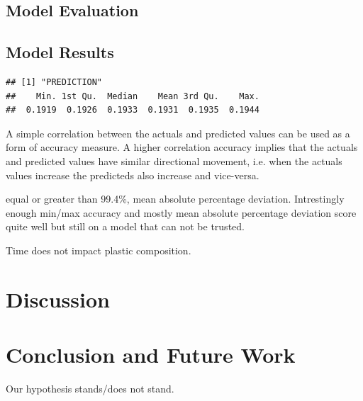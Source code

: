 \documentclass[10pt]{article}\usepackage[]{graphicx}\usepackage[]{color}
\makeatletter
\newenvironment{kframe}{%
 \def\at@end@of@kframe{}%
 \ifinner\ifhmode%
  \def\at@end@of@kframe{\end{minipage}}%
  \begin{minipage}{\columnwidth}%
 \fi\fi%
 \def\FrameCommand##1{\hskip\@totalleftmargin \hskip-\fboxsep
 \colorbox{shadecolor}{##1}\hskip-\fboxsep
     \hskip-\linewidth \hskip-\@totalleftmargin \hskip\columnwidth}%
 \MakeFramed {\advance\hsize-\width
   \@totalleftmargin\z@ \linewidth\hsize
   \@setminipage}}%
 {\par\unskip\endMakeFramed%
 \at@end@of@kframe}
\newenvironment{knitrout}{}{} %
\makeatother
\begin{document}
\subsection{Model Evaluation}


\subsection{Model Results}

\begin{knitrout}
\color{fgcolor}\begin{kframe}
\begin{verbatim}
## [1] "PREDICTION"
##    Min. 1st Qu.  Median    Mean 3rd Qu.    Max. 
##  0.1919  0.1926  0.1933  0.1931  0.1935  0.1944
\end{verbatim}


{\ttfamily\noindent\bfseries{}}\end{kframe}
\end{knitrout}

A simple correlation between the actuals and predicted values can be used as a form of accuracy measure. A higher correlation accuracy implies that the actuals and predicted values have similar directional movement, i.e. when the actuals values increase the predicteds also increase and vice-versa.

equal or greater than 99.4\%, mean absolute percentage deviation.
Intrestingly enough min/max accuracy and mostly mean absolute percentage deviation score quite well but still on a model that can not be trusted.

Time does not impact plastic composition.



\pagebreak
\section{Discussion}



\section{Conclusion and Future Work}\label{cdsmote1}

Our hypothesis stands/does not stand.


\end{document}

